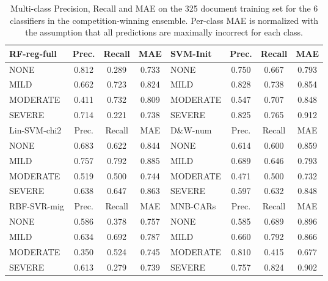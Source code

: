 \begin{table}[]
    \centering
    \begin{tabular}{|l|c|c|c|l|c|c|c|}
          \hline
   \cellcolor{gray!15} \textsf{RF-reg-full} & \textsf{Prec.} & \textsf{Recall} & \textsf{MAE} & \cellcolor{gray!15} \textsf{SVM-Init} & \textsf{Prec.} & \textsf{Recall} & \textsf{MAE} \\
   \hline
    \textsf{NONE} & \cellcolor{gray!15} 0.812 & 0.289 & 0.733 & \textsf{NONE} & 0.750 & 0.667 & 0.793 \\
    \textsf{MILD} & 0.662 & 0.723 & \cellcolor{gray!15} 0.824 & \textsf{MILD} & \cellcolor{gray!15} 0.828 & 0.738 & 0.854 \\
    \textsf{MODERATE} & 0.411 & \cellcolor{gray!15} 0.732 & 0.809 & \textsf{MODERATE} & 0.547 & 0.707 & 0.848 \\
    \textsf{SEVERE} & 0.714 & 0.221 & 0.738 & \textsf{SEVERE} & 0.825 & \cellcolor{gray!15} 0.765 & \cellcolor{gray!15} 0.912 \\
   \hline
   \cellcolor{gray!15} \textsf{Lin-SVM-chi2} & \textsf{Prec.} & \textsf{Recall} & \textsf{MAE} & \cellcolor{gray!15} \textsf{D\&W-num} & \textsf{Prec.} & \textsf{Recall} & \textsf{MAE} \\
   \hline
    \textsf{NONE} & 0.683 & 0.622 & 0.844 & \textsf{NONE} &  0.614 & 0.600 & \cellcolor{gray!15} 0.859 \\
    \textsf{MILD} & \cellcolor{gray!15} 0.757 &\cellcolor{gray!15}  0.792 & \cellcolor{gray!15} 0.885 & \textsf{MILD} & \cellcolor{gray!15} 0.689 & \cellcolor{gray!15} 0.646 & 0.793 \\
    \textsf{MODERATE} & 0.519 & 0.500 & 0.744 & \textsf{MODERATE} & 0.471 & 0.500 & 0.732 \\
    \textsf{SEVERE} & 0.638 & 0.647 & 0.863 & \textsf{SEVERE} & 0.597 & 0.632 & 0.848 \\
   \hline
   \cellcolor{gray!15} \textsf{RBF-SVR-mig} & \textsf{Prec.} & \textsf{Recall} & \textsf{MAE} & \cellcolor{gray!15} \textsf{MNB-CARs} & \textsf{Prec.} & \textsf{Recall} & \textsf{MAE} \\
   \hline
    \textsf{NONE} & 0.586 & 0.378 & 0.757 & \textsf{NONE} & 0.585 & 0.689 & 0.896 \\
    \textsf{MILD} & \cellcolor{gray!15} 0.634 & \cellcolor{gray!15} 0.692 & \cellcolor{gray!15} 0.787 & \textsf{MILD} & 0.660 & \cellcolor{gray!15} 0.792 & 0.866 \\
    \textsf{MODERATE} & 0.350 & 0.524 & 0.745 & \textsf{MODERATE} & \cellcolor{gray!15} 0.810 & 0.415 & 0.677 \\
    \textsf{SEVERE} & 0.613 & 0.279 & 0.739 & \textsf{SEVERE} & 0.757 & 0.824 & \cellcolor{gray!15} 0.902 \\
   \hline
    \end{tabular}
    \caption{Multi-class Precision, Recall and MAE on the 325 document training set for the 6 classifiers in the competition-winning ensemble. Per-class MAE is normalized with the assumption that all predictions are maximally incorrect for each class.}
    \label{tab:BestEnsembleClassifiersMetrics}
\end{table}

